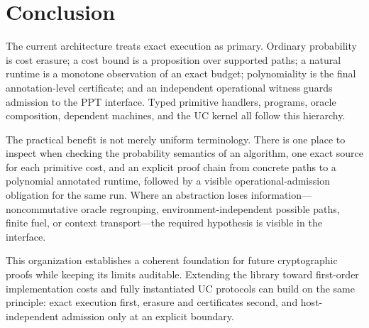 \section{Conclusion}
\label{sec:conclusion}

The current \LeanCrypto architecture treats exact execution as primary.
Ordinary probability is cost erasure; a cost bound is a proposition over
supported paths; a natural runtime is a monotone observation of an exact
budget; polynomiality is the final annotation-level certificate; and an
independent operational witness guards admission to the PPT interface.  Typed primitive
handlers, programs, oracle composition, dependent machines, and the UC kernel
all follow this hierarchy.

The practical benefit is not merely uniform terminology.  There is one place
to inspect when checking the probability semantics of an algorithm, one exact
source for each primitive cost, and an explicit proof chain from concrete paths
to a polynomial annotated runtime, followed by a visible operational-admission
obligation for the same run.  Where an abstraction loses information---noncommutative
oracle regrouping, environment-independent possible paths, finite fuel, or
context transport---the required hypothesis is visible in the interface.

This organization establishes a coherent foundation for future cryptographic
proofs while keeping its limits auditable.  Extending the library toward
first-order implementation costs and fully instantiated UC protocols can build
on the same principle: exact execution first, erasure and certificates second,
and host-independent admission only at an explicit boundary.
